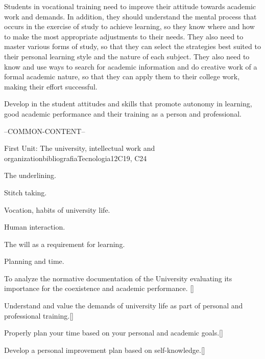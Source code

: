 \begin{syllabus}


\begin{justification}
Students in vocational training need to improve their attitude towards academic work and demands. In addition, they should understand the mental process that occurs in the exercise of study to achieve learning, so they know where and how to make the most appropriate adjustments to their needs. They also need to master various forms of study, so that they can select the strategies best suited to their personal learning style and the nature of each subject. They also need to know and use ways to search for academic information and do creative work of a formal academic nature, so that they can apply them to their college work, making their effort successful.
\end{justification}

\begin{goals}
\item Develop in the student attitudes and skills that promote autonomy in learning, good academic performance and their training as a person and professional.
\end{goals}

--COMMON-CONTENT--

\begin{unit}{}{First Unit: The university, intellectual work and organization}{bibliografiaTecnologia}{12}{C19, C24}
\begin{topics}
        \item The underlining.
        \item Stitch taking.
        \item Vocation, habits of university life.
        \item Human interaction.
        \item The will as a requirement for learning.
        \item Planning and time.
\end{topics}
\begin{learningoutcomes}
        \item To analyze the normative documentation of the University evaluating its importance for the coexistence and academic performance. [\Usage]
        \item Understand and value the demands of university life as part of personal and professional training.[\Usage]
        \item Properly plan your time based on your personal and academic goals.[\Usage]
        \item Develop a personal improvement plan based on self-knowledge.[\Usage]
\end{learningoutcomes}
\end{unit}


\end{syllabus}
